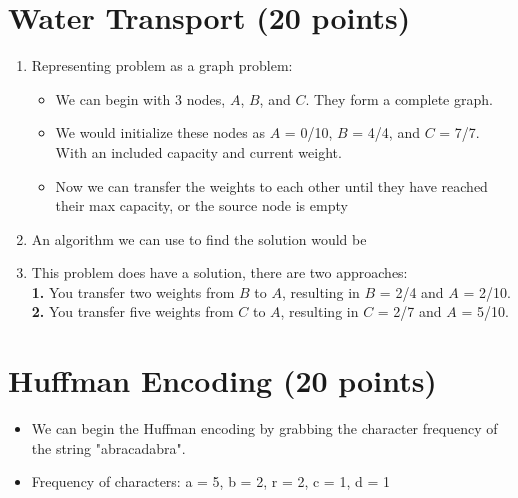 \documentclass{article}[12pt]
\begin{document}
\section{Water Transport (20 points)}
\begin{enumerate}
  \item Representing problem as a graph problem: 
    \begin{itemize}
      \item We can begin with 3 nodes, $A$, $B$, and $C$. They form a complete graph.
      \item We would initialize these nodes as $A$ = 0/10, $B$ = 4/4, and $C$ = 7/7.
        With an included capacity and current weight.
      \item Now we can transfer the weights to each other until they have reached their max capacity, or the source node is empty
    \end{itemize}
  \item An algorithm we can use to find the solution would be
    \item This problem does have a solution, there are two approaches: \\ 
      \textbf{1.} You transfer two weights from $B$ to $A$, resulting in $B$ = 2/4 and $A$ = 2/10.  \\
      \textbf{2.} You transfer five weights from $C$ to $A$, resulting in $C$ = 2/7 and  $A$ = 5/10.
\end{enumerate}

\newpage
\section{Huffman Encoding (20 points)}
\begin{itemize}
  \item We can begin the Huffman encoding by grabbing the character frequency
    of the string "abracadabra".
  \item Frequency of characters: a = 5, b = 2, r = 2, c = 1, d = 1
\end{itemize}
\end{document}
